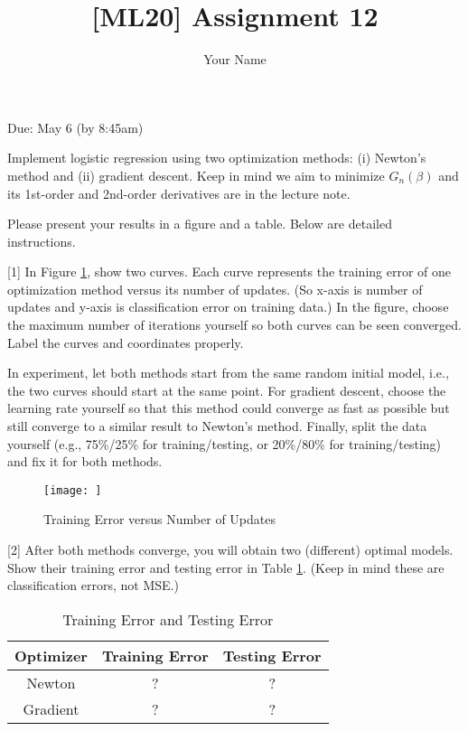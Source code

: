 \documentclass{llncs}
\title{[ML20] Assignment 12}
\author{Your Name}
\institute{}
\begin{document}
\maketitle 

\setlength\parindent{0pt} 
\setlength{\parskip}{10pt}

Due: May 6 (by 8:45am) 

Implement logistic regression using 
two optimization methods: 
(i) Newton's method and 
(ii) gradient descent. 
Keep in mind we aim to minimize 
$G_{n}(\beta)$ and its 1st-order
and 2nd-order derivatives are in 
the lecture note. 

Please present your results in 
a figure and a table. Below are 
detailed instructions. 

[1] In Figure \ref{hw12_fig1}, 
show two curves. 
Each curve represents the 
training error of one optimization 
method versus its number of updates. 
(So x-axis is number of updates 
and y-axis is classification error 
on training data.) In the figure, 
choose the maximum
number of iterations 
yourself so both curves can be seen
converged. Label the curves and 
coordinates properly. 

In experiment, let both methods 
start from the same random initial model, i.e., the two curves should
start at the same point. 
For gradient descent, choose the 
learning rate yourself so that 
this method could converge as fast 
as possible but still converge 
to a similar result to Newton's method. 
Finally, split the data yourself 
(e.g., 75\%/25\% for training/testing, 
or 20\%/80\% for training/testing) 
and fix it for both methods. 

\begin{figure}[h!] 
\centering 
\texttt{[image: ]} 
\caption{Training Error versus 
Number of Updates} 
\label{hw12_fig1}
\end{figure}

\newpage 

[2] After both methods converge, 
you will obtain two (different) 
optimal models. 
Show their training error and 
testing error in 
Table \ref{hw12_tab1}. 
(Keep in mind these are 
classification errors, not MSE.) 

\begin{table}
\caption{Training Error and 
Testing Error}
\centering
\setlength{\tabcolsep}{10pt} %
\def\arraystretch{2} %
\begin{tabular}{c|c|c} \hline 
Optimizer & Training Error & Testing Error \\ \hline 
Newton & ? & ?\\ \hline
Gradient & ? & ?\\ \hline 
\end{tabular}
\label{hw12_tab1}
\end{table}
\end{document}
